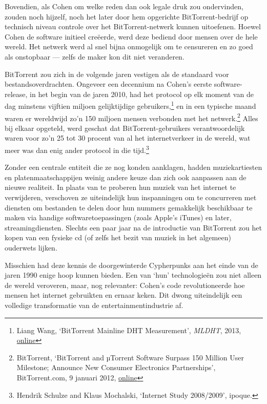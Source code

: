 \documentclass[smalldemyvopaper,11pt,twoside,onecolumn,openright,extrafontsizes,hidelinks]{memoir}
\begin{document}
Bovendien, als Cohen om welke reden dan ook legale druk zou ondervinden,
zouden noch hijzelf, noch het later door hem opgerichte
BitTorrent-bedrijf op technisch niveau controle over het
BitTorrent-netwerk kunnen uitoefenen. Hoewel Cohen de software initieel
creëerde, werd deze bediend door mensen over de hele wereld. Het netwerk
werd al snel bijna onmogelijk om te censureren en zo goed als onstopbaar
--- zelfs de maker kon dit niet veranderen.

BitTorrent zou zich in de volgende jaren vestigen als de standaard voor
bestandsoverdrachten. Ongeveer een decennium na Cohen's eerste
software-release, in het begin van de jaren 2010, had het protocol op
elk moment van de dag minstens vijftien miljoen gelijktijdige
gebruikers,\footnote{Liang Wang, `BitTorrent Mainline DHT Measurement',
  \emph{MLDHT}, 2013,
  \href{https://www.cl.cam.ac.uk//~lw525/MLDHT/}{online}} en in een
typische maand waren er wereldwijd zo'n 150 miljoen mensen verbonden met
het netwerk.\footnote{BitTorrent, `BitTorrent and µTorrent Software
  Surpass 150 Million User Milestone; Announce New Consumer Electronics
  Partnerships', BitTorrent.com, 9 januari 2012,
  \href{https://web.archive.org/web/20140326102305/http://www.bittorrent.com/intl/es/company/about/ces_2012_150m_users}{online}}
Alles bij elkaar opgeteld, werd geschat dat BitTorrent-gebruikers
verantwoordelijk waren voor zo'n 25 tot 30 procent van al het
internetverkeer in de wereld, wat meer was dan enig ander protocol in
die tijd.\footnote{Hendrik Schulze and Klaus Mochalski, `Internet Study
  2008/2009', ipoque.}

Zonder een centrale entiteit die ze nog konden aanklagen, hadden
muziekartiesten en platenmaatschappijen weinig andere keuze dan zich ook
aanpassen aan de nieuwe realiteit. In plaats van te proberen hun muziek
van het internet te verwijderen, verschoven ze uiteindelijk hun
inspanningen om te concurreren met diensten om bestanden te delen door
hun nummers gemakkelijk beschikbaar te maken via handige
softwaretoepassingen (zoals Apple's iTunes) en later, streamingdiensten.
Slechts een paar jaar na de introductie van BitTorrent zou het kopen van
een fysieke cd (of zelfs het bezit van muziek in het algemeen) ouderwets
lijken.

Misschien had deze kennis de doorgewinterde Cypherpunks aan het einde
van de jaren 1990 enige hoop kunnen bieden. Een van `hun' technologieën
zou niet alleen de wereld veroveren, maar, nog relevanter: Cohen's code
revolutioneerde hoe mensen het internet gebruikten en ernaar keken. Dit
dwong uiteindelijk een volledige transformatie van de
entertainmentindustrie af.
\end{document}
